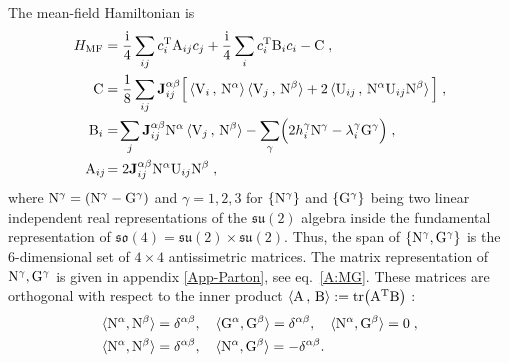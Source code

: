 The mean-field Hamiltonian is
\begin{align}
    H_{\mathrm{MF}} &=\frac{\mathrm{i}}{4} \sum_{ij}  c_i^{{\mathrm{T}}}   \mathrm{A}_{ij}  c_j + \frac{\mathrm{i}}{4} \sum_i  c_i^{{\mathrm{T}}}   \mathrm{B}_{i}  c_i- \mathrm{C} \; , \\
    \mathrm{C} &= \frac{1}{8} \sum_{ij}  \mathbf{J}_{ij}^{\alpha\beta} \Big[
       \braket{ \mathrm{V}_{i} \, , \,  \mathrm{N}^\alpha } \braket{ \mathrm{V}_{j} \, , \,  \mathrm{N}^\beta }
       +2\braket{ \mathrm{U}_{ij} \, , \,  \mathrm{N}^\alpha   \mathrm{U}_{ij} \mathrm{N}^\beta }   \Big]   \; ,  \label{eq:C} \\
    \mathrm{B}_{i}&=\! \sum_{j}  \mathbf{J}_{ij}^{\alpha\beta}
    \mathrm{N}^\alpha \braket{ \mathrm{V}_{j} \, , \,  \mathrm{N}^\beta }
    -\sum_{\gamma}\!\Big( 2h_i^\gamma  \mathrm{N}^\gamma  - \lambda_i^\gamma  \mathrm{G}^\gamma \Big)
    \; , \label{eq:B} \\
    \mathrm{A}_{ij} \!&= 2 \mathbf{J}_{ij}^{\alpha\beta}  \mathrm{N}^\alpha \mathrm{U}_{ij} \mathrm{N}^\beta     \; ,  \label{eq:A}
\end{align}
where  $\mathrm{N}^\gamma=(\mathrm{N}^\gamma-\mathrm{G}^\gamma) $ and $\gamma = 1,2,3$ for $\{\mathrm{N}^\gamma\}$ and $\{\mathrm{G}^\gamma\}$ being two linear independent real representations of the $\mathfrak{su}(2)$ algebra inside the fundamental representation of $\mathfrak{so}(4)=\mathfrak{su}(2)\times\mathfrak{su}(2)$. Thus, the span of $\{ \mathrm{N}^\gamma, \mathrm{G}^\gamma \}$ is the $6$-dimensional set of $4\times 4$ antissimetric matrices.
The matrix representation of $\mathrm{N}^\gamma, \mathrm{G}^\gamma $ is given in appendix \ref{App-Parton}, see eq.~\eqref{A:MG}.
These matrices are orthogonal with respect to the inner product $\braket{\mathrm{A} \, , \,  \mathrm{B}} :=\mathrm{tr}\!\left( \mathrm{A}^{\mathrm{T}} \mathrm{B} \right) $ :
\begin{align}
    \braket{\mathrm{N}^\alpha , \mathrm{N}^\beta} &=  \delta^{\alpha\beta}, \quad
    \braket{ \mathrm{G}^\alpha , \mathrm{G}^\beta } =  \delta^{\alpha\beta}, \quad
    \braket{ \mathrm{N}^\alpha , \mathrm{G}^\beta } = 0 \; , \\
    \braket{ \mathrm{N}^\alpha , \mathrm{N}^\beta } &=  \delta^{\alpha\beta}, \quad
    \braket{ \mathrm{N}^\alpha , \mathrm{G}^\beta } = - \delta^{\alpha\beta} .
\end{align}

